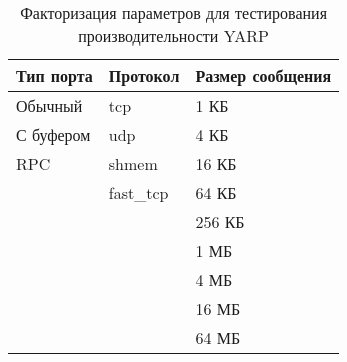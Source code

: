 \begin{table}[]
	\centering
	\caption{Факторизация параметров для тестирования производительности YARP}
	\label{table:chapter2:yarp_test_cases}
	\def\arraystretch{1.5}
	\newcommand{\sr}{\rule[-0.45cm]{0pt}{0.9cm}}
		\begin{tabular}{|p{5cm}|p{4cm}|p{4cm}|}
			\hline
			\textbf{Тип порта} & \textbf{Протокол} & \textbf{Размер сообщения} \\ \hline
			Обычный           & tcp                 & 1 КБ   \\ \hline
			С буфером         & udp                 & 4 КБ   \\ \hline
			RPC               & shmem               & 16 КБ  \\ \hline
			\multirow{7}{*}{} & fast\_tcp           & 64 КБ  \\ \cline{2-3} 
			                  &  \multirow{5}{*}{}  & 256 КБ \\ \cline{3-3} 
			&                                       & 1 МБ   \\ \cline{3-3} 
			&                                       & 4 МБ   \\ \cline{3-3}
			&                                       & 16 МБ  \\ \cline{3-3}
			&                                       & 64 МБ  \\ \hline
		\end{tabular}%

\end{table}